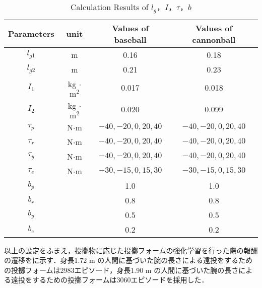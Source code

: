 \begin{table}[tb]
  \begin{center}
    \caption{Calculation Results of $l_{g}$，$I$，$\tau$，$b$}
    \begin{tabular}{c|c|c|c}
      \hline
      Parameters & unit & Values of baseball & Values of cannonball \\
      \hline
      $l_{g1}$ & m & 0.16 & 0.18 \\
      $l_{g2}$ & m & 0.21 & 0.23 \\
      $I_{1}$ & kg $\cdot$ $\mathrm{m}^2$ & 0.017 & 0.018 \\
      $I_{2}$ & kg $\cdot$ $\mathrm{m}^2$ & 0.020 & 0.099 \\
      $\tau_{p}$ & N$\cdot$m & $-40, -20, 0, 20, 40$ & $-40, -20, 0, 20, 40$ \\
      $\tau_{r}$ & N$\cdot$m & $-40, -20, 0, 20, 40$ & $-40, -20, 0, 20, 40$ \\
      $\tau_{y}$ & N$\cdot$m & $-40, -20, 0, 20, 40$ & $-40, -20, 0, 20, 40$ \\
      $\tau_{e}$ & N$\cdot$m & $-30, -15, 0, 15, 30$ & $-30, -15, 0, 15, 30$ \\
      $b_{p}$ &  & 1.0 & 1.0\\
      $b_{r}$ &  & 0.8 & 0.8\\
      $b_{y}$ &  & 0.5 & 0.5\\
      $b_{e}$ &  & 0.2 & 0.2\\
      \hline
    \end{tabular}
  \end{center}
\end{table}

以上の設定をふまえ，投擲物に応じた投擲フォームの強化学習を行った際の報酬の遷移をに示す．身長1.72 m の人間に基づいた腕の長さによる遠投をするための投擲フォームは2983エピソード，身長1.90 m の人間に基づいた腕の長さによる遠投をするための投擲フォームは3060エピソードを採用した．


